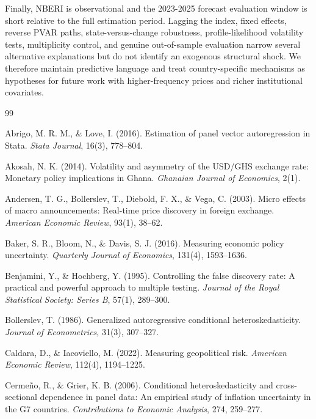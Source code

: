 \documentclass[11pt]{article}
\begin{document}
Finally, NBERI is observational and the 2023-2025 forecast evaluation
window is short relative to the full estimation period. Lagging the
index, fixed effects, reverse PVAR paths, state-versus-change
robustness, profile-likelihood volatility tests, multiplicity control,
and genuine out-of-sample evaluation narrow several alternative
explanations but do not identify an exogenous structural shock. We
therefore maintain predictive language and treat
country-specific mechanisms as hypotheses for future work with
higher-frequency prices and richer institutional covariates.

\begin{thebibliography}{99}
\setlength{\itemsep}{0.35em}

Abrigo, M. R. M., \& Love, I. (2016). Estimation of panel vector autoregression in Stata. \textit{Stata Journal}, 16(3), 778--804.

Akosah, N. K. (2014). Volatility and asymmetry of the USD/GHS exchange rate: Monetary policy implications in Ghana. \textit{Ghanaian Journal of Economics}, 2(1).

Andersen, T. G., Bollerslev, T., Diebold, F. X., \& Vega, C. (2003). Micro effects of macro announcements: Real-time price discovery in foreign exchange. \textit{American Economic Review}, 93(1), 38--62.

Baker, S. R., Bloom, N., \& Davis, S. J. (2016). Measuring economic policy uncertainty. \textit{Quarterly Journal of Economics}, 131(4), 1593--1636.

Benjamini, Y., \& Hochberg, Y. (1995). Controlling the false discovery rate: A practical and powerful approach to multiple testing. \textit{Journal of the Royal Statistical Society: Series B}, 57(1), 289--300.

Bollerslev, T. (1986). Generalized autoregressive conditional heteroskedasticity. \textit{Journal of Econometrics}, 31(3), 307--327.

Caldara, D., \& Iacoviello, M. (2022). Measuring geopolitical risk. \textit{American Economic Review}, 112(4), 1194--1225.

Cermeño, R., \& Grier, K. B. (2006). Conditional heteroskedasticity and cross-sectional dependence in panel data: An empirical study of inflation uncertainty in the G7 countries. \textit{Contributions to Economic Analysis}, 274, 259--277.


\end{thebibliography}
\end{document}
